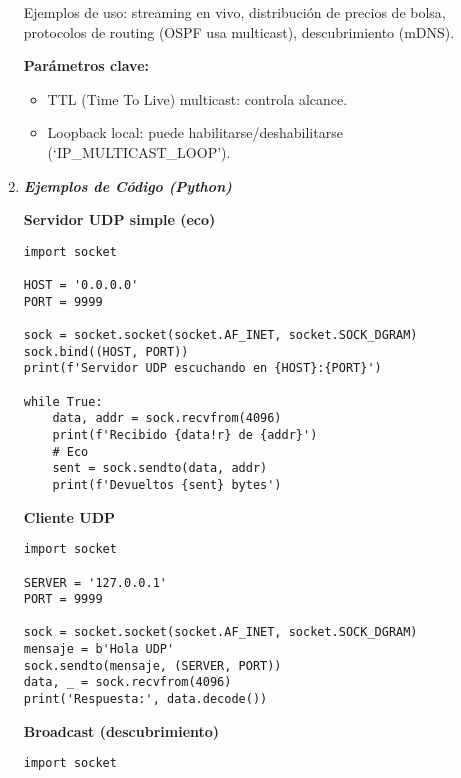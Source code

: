 \documentclass[12pt]{amsart}
\begin{document}
\begin{enumerate}
		Ejemplos de uso: streaming en vivo, distribución de precios de bolsa, protocolos de routing (OSPF usa multicast), descubrimiento (mDNS).

		\medskip \medskip
		
		\noindent \textbf{Parámetros clave:}

		\medskip \medskip

		\begin{itemize}
		\item TTL (Time To Live) multicast: controla alcance.
		\item Loopback local: puede habilitarse/deshabilitarse (`IP\_MULTICAST\_LOOP').
		\end{itemize}

		\bigskip\bigskip

		\item \textbf{\textit{Ejemplos de Código (Python)}}
		\medskip

		\noindent \textbf{Servidor UDP simple (eco)}
		\medskip \medskip
		\begin{lstlisting}
import socket

HOST = '0.0.0.0'
PORT = 9999

sock = socket.socket(socket.AF_INET, socket.SOCK_DGRAM)
sock.bind((HOST, PORT))
print(f'Servidor UDP escuchando en {HOST}:{PORT}')

while True:
	data, addr = sock.recvfrom(4096)
	print(f'Recibido {data!r} de {addr}')
	# Eco
	sent = sock.sendto(data, addr)
	print(f'Devueltos {sent} bytes')
		\end{lstlisting}

		\medskip \medskip

		\noindent \textbf{Cliente UDP}
		\medskip \medskip
		\begin{lstlisting}
import socket

SERVER = '127.0.0.1'
PORT = 9999

sock = socket.socket(socket.AF_INET, socket.SOCK_DGRAM)
mensaje = b'Hola UDP'
sock.sendto(mensaje, (SERVER, PORT))
data, _ = sock.recvfrom(4096)
print('Respuesta:', data.decode())
		\end{lstlisting}

		\medskip \medskip

		\noindent \textbf{Broadcast (descubrimiento)}
		\medskip \medskip
		\begin{lstlisting}
import socket


\end{lstlisting}
\end{enumerate}
\end{document}
